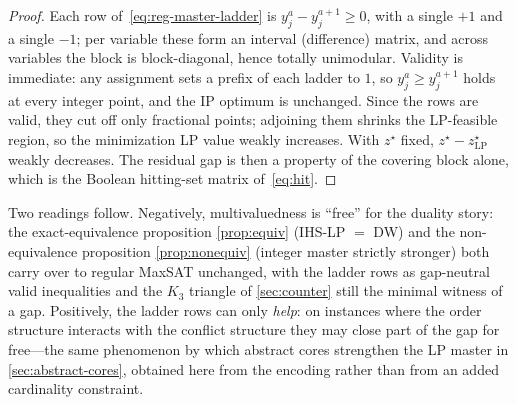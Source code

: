 \begin{proof}
Each row of~\eqref{eq:reg-master-ladder} is $y_j^{a} - y_j^{a+1} \ge 0$, with a
single $+1$ and a single $-1$; per variable these form an interval (difference)
matrix, and across variables the block is block-diagonal, hence totally
unimodular. Validity is immediate: any assignment sets a prefix of each ladder
to $1$, so $y_j^{a}\ge y_j^{a+1}$ holds at every integer point, and the IP
optimum is unchanged. Since the rows are valid, they cut off only fractional
points; adjoining them shrinks the LP-feasible region, so the minimization LP
value weakly increases. With $z^\star$ fixed, $z^\star - z^\star_{\mathrm{LP}}$
weakly decreases. The residual gap is then a property of the covering block
alone, which is the Boolean hitting-set matrix of~\eqref{eq:hit}.
\end{proof}

Two readings follow. Negatively, multivaluedness is ``free'' for the
duality story: the exact-equivalence proposition \cref{prop:equiv} (IHS-LP $=$
DW) and the non-equivalence proposition \cref{prop:nonequiv} (integer master
strictly stronger) both carry over to regular MaxSAT unchanged, with the ladder
rows as gap-neutral valid inequalities and the $K_3$ triangle of
\cref{sec:counter} still the minimal witness of a gap. Positively, the ladder
rows can only \emph{help}: on instances where the order structure interacts with
the conflict structure they may close part of the gap for free---the same
phenomenon by which abstract cores strengthen the LP master in
\cref{sec:abstract-cores}, obtained here from the encoding rather than from an
added cardinality constraint.


